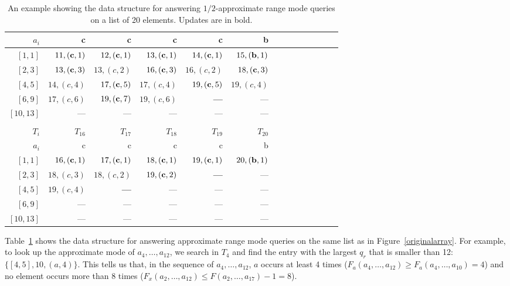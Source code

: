\documentclass{llncs}
\begin{document}
\begin{table}[htb]
\begin{center}
\begin{tabular}{|r|r|r|r|r|r|r|r|r|r|r|r|r|r|}
$a_i$    &c                     &c                     &c                     &c                     & b \\ \hline 
$[1,1]$  &$11,({\bf c},1)$      &$12,({\bf c},1)$      &$13,({\bf c},1)$      &$14,({\bf c},1)$      &$15,({\bf b},1)$ \\
$[2,3]$  &$13,({\bf c},3)$      &$13,(c,2)$            &$16,({\bf c},3)$      &$16,(c,2)$            &$18,({\bf c},3)$ \\
$[4,5]$  &$14,(c,4)$            &$17,({\bf c},5)$      &$17,(c,4)$            &$19,({\bf c},5)$      &$19,(c,4)$  \\
$[6,9]$  &$17,(c,6)$            &$19,({\bf c},7)$      &$19,(c,6)$            &{\bf ---}             & --- \\  
$[10,13]$&---                   &---                   &---                   &---                   &---\\ \hline    
\multicolumn{6}{c}{}\\ \hline
$T_i$    &$T_{16}$                &$T_{17}$                &$T_{18}$                &$T_{19}$              &$T_{20}$ \\
$a_i$    & c                    & c                    & c                    & c                    & b \\ \hline
$[1,1]$  &$16,({\bf c},1)$      &$17,({\bf c},1)$      &$18,({\bf c},1)$      &$19,({\bf c},1)$      &$20,({\bf b},1)$\\
$[2,3]$  &$18,(c,3)$            &$18,(c,2)$            &$19,({\bf c},2)$      &{\bf ---}             & --- \\
$[4,5]$  &$19,(c,4)$            &{\bf ---}             & ---                  & ---                  & --- \\
$[6,9]$  & ---                  & ---                  & ---                  & ---                  & --- \\ 
$[10,13]$&---                   &---                   & ---                  & ---                  & --- \\ \hline   

\end{tabular}\caption{\label{a lookup table example}An example showing the data structure for
answering $1/2$-approximate range mode queries on a list of 20 elements. Updates are in bold.}

\end{center}
\end{table}

Table~\ref{a lookup table example} shows the data structure for answering
approximate range mode queries on the same list as in Figure~\ref{originalarray}. 
For example, to look up the approximate mode of $a_4, \ldots, a_{12}$, we search 
in $T_4$ and find the entry with the largest $q_r$ that is smaller than 12: 
$\{[4,5],10,(a,4)\}$. This tells us that, in the sequence of $a_4,
\ldots, a_{12}$, $a$ occurs at 
least 4 times ($F_a(a_4,\ldots,a_{12}) \ge F_a(a_4,\ldots,a_{10}) = 4$) 
and no element occurs more than $8$ times ($F_x(a_2,\ldots,a_{12}) \leq F(a_2,\ldots,a_{17}) -1 = 8$).
\end{document}
